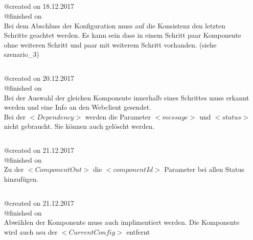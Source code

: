 \documentclass{article}
\begin{document}
\subsection{}
@created on 18.12.2017\\
@finished on \\

Bei dem Abschluss der Konfiguration muss auf die Konsistenz den letzten
Schritte geachtet werden. Es kann sein dass in einem Schritt paar Komponente
ohne weiteren Schritt und paar mit weiterem Schritt vorhanden. (siehe
szenario\_3)\\

\subsection{}
@created on 20.12.2017\\
@finished on \\

Bei der Auswahl der gleichen Komponente innerhalb eines Schrittes muss erkannt
werden und eine Info an den Webclient gesendet.\\

Bei der $<Dependency>$ werden die Parameter $<message>$ und $<status>$ nicht
gebraucht. Sie k\"onnen auch gel\"oscht werden.\\

\subsection{}
@created on 21.12.2017\\
@finished on \\

Zu der $<ComponentOut>$ die $<componentId>$ Parameter bei allen Status
hinzuf\"ugen.\\

\subsection{}
@created on 21.12.2017\\
@finished on \\

Abw\"ahlen der Komponente muss auch implimentiert werden. Die Komponente wird
auch asu der $<CurrentConfig>$ entfernt
\end{document}

